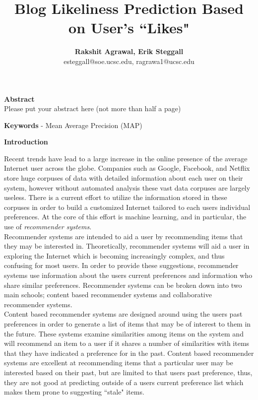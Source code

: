 \documentclass[12pt]{article} %
\title{Blog Likeliness Prediction Based on User's ``Likes"}
\author{\textbf{Rakshit Agrawal, Erik Steggall}\\ esteggall@soe.ucsc.edu, ragrawa1@ucsc.edu}
\date{} %
\begin{document}
\maketitle
\thispagestyle{empty}


\noindent \textbf{Abstract} \\
\noindent Please put your abstract here (not more than half a page)

\vspace{18pt}
\noindent \textbf{Keywords} - Mean Average Precision (MAP)


\noindent \textbf{Introduction} \\
\noindent 

Recent trends have lead to a large increase in the online presence of the average Internet user across the globe. Companies such as Google, Facebook, and Netflix store huge corpuses of data with detailed information about each user on their system, however without automated analysis these vast data corpuses are largely useless. There is a current effort to utilize the information stored in these corpuses in order to build a customized Internet tailored to each users individual preferences. At the core of this effort is machine learning, and in particular, the use of \textit{recommender systems}.\\
Recommender systems are intended to aid a user by recommending items that they may be interested in. Theoretically, recommender systems will aid a user in exploring the Internet which is becoming increasingly complex, and thus confusing for most users. In order to provide these suggestions, recommender systems use information about the users current preferences and information who share similar preferences. Recommender systems can be broken down into two main schools; content based recommender systems and collaborative recommender systems.\\
Content based recommender systems are designed around using the users past preferences in order to generate a list of items that may be of interest to them in the future. These systems examine similarities among items on the system and will recommend an item to a user if it shares a number of similarities with items that they have indicated a preference for in the past. Content based recommender systems are excellent at recommending items that a particular user may be interested based on their past, but are limited to that users past preference, thus, they are not good at predicting outside of a users current preference list which makes them prone to suggesting ``stale" items.\\
\end{document}
